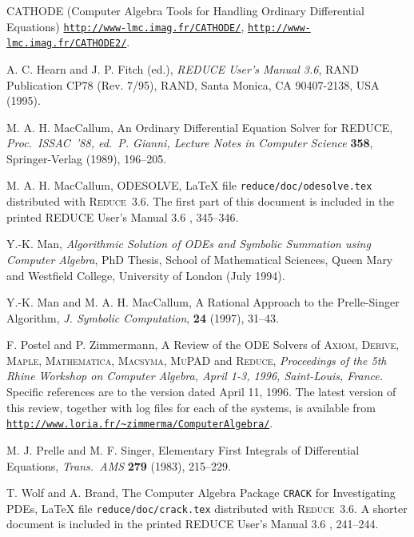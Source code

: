 \documentclass[a4paper]{article} %
\newcommand{\REDUCE}{\textsc{Reduce}}
\begin{document}
\begin{thebibliography}{99}

 CATHODE (Computer Algebra Tools for Handling
Ordinary Differential Equations)
\href{http://www-lmc.imag.fr/CATHODE/}%
{\texttt{http://www-lmc.imag.fr/CATHODE/}},
\href{http://www-lmc.imag.fr/CATHODE2/}%
{\texttt{http://www-lmc.imag.fr/CATHODE2/}}.

 A. C. Hearn and J. P. Fitch (ed.),
\textit{REDUCE User's Manual 3.6}, RAND Publication CP78 (Rev. 7/95),
RAND, Santa Monica, CA 90407-2138, USA (1995).

 M. A. H. MacCallum, An Ordinary Differential
Equation Solver for REDUCE, \textit{Proc.\ ISSAC~'88, ed.\ P. Gianni,
Lecture Notes in Computer Science} \textbf{358}, Springer-Verlag
(1989), 196--205.

 M. A. H. MacCallum, ODESOLVE, \LaTeX{} file
\texttt{reduce/doc/odesolve.tex} distributed with \REDUCE~3.6.  The
first part of this document is included in the printed REDUCE User's
Manual 3.6 \cite{Hearn-manual}, 345--346.

 Y.-K. Man, \textit{Algorithmic Solution of ODEs and
Symbolic Summation using Computer Algebra}, PhD Thesis, School of
Mathematical Sciences, Queen Mary and Westfield College, University of
London (July 1994).

 Y.-K. Man and M. A. H. MacCallum, A Rational
Approach to the Prelle-Singer Algorithm, \textit{J. Symbolic
Computation}, \textbf{24} (1997), 31--43.

 F. Postel and P. Zimmermann, A Review of the ODE
Solvers of \textsc{Axiom}, \textsc{Derive}, \textsc{Maple},
\textsc{Mathematica}, \textsc{Macsyma}, \textsc{MuPAD} and
\textsc{Reduce}, \textit{Proceedings of the 5th Rhine Workshop on
Computer Algebra, April 1-3, 1996, Saint-Louis, France.}
Specific references are to the version dated April 11, 1996.
The latest version of this review, together with log files for each of
the systems, is available from
\href{http://www.loria.fr/~zimmerma/ComputerAlgebra/}%
{\texttt{http://www.loria.fr/\textasciitilde zimmerma/ComputerAlgebra/}}.

 M. J. Prelle and M. F. Singer, Elementary
First Integrals of Differential Equations, \textit{Trans.\ AMS}
\textbf{279} (1983), 215--229.

 T. Wolf and A. Brand, The Computer Algebra Package
\texttt{CRACK} for Investigating PDEs, \LaTeX{} file
\texttt{reduce/doc/crack.tex} distributed with \REDUCE~3.6.  A shorter
document is included in the printed REDUCE User's Manual 3.6
\cite{Hearn-manual}, 241--244.


\end{thebibliography}
\end{document}

